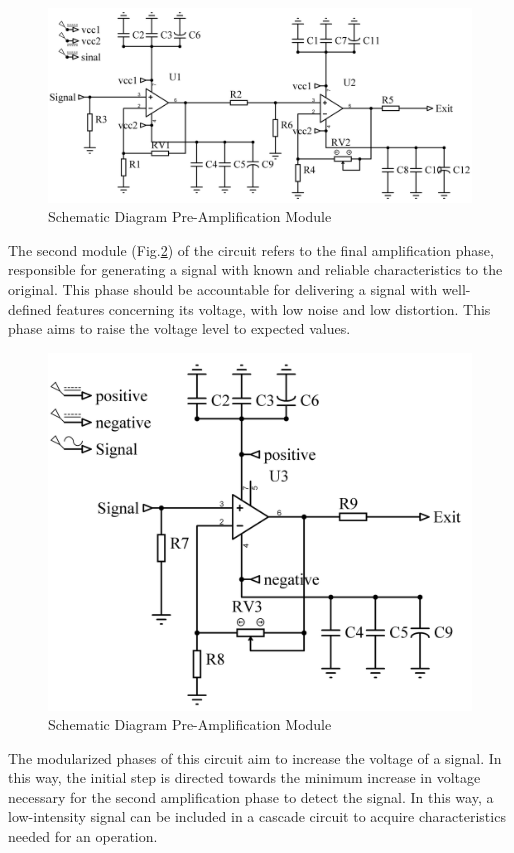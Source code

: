 \documentclass{ws-m3as}
\begin{document}
\begin{figure}[H]
	\centering  
	\includegraphics[width=0.9\linewidth]{Figures/SchematicPreamp}
	\caption{Schematic Diagram Pre-Amplification Module}
	\label{fig:7}
\end{figure}

The second module (Fig.\ref{fig:8}) of the circuit refers to the final amplification phase, responsible for generating a signal with known and reliable characteristics to the original. This phase should be accountable for delivering a signal with well-defined features concerning its voltage, with low noise and low distortion. This phase aims to raise the voltage level to expected values.

\begin{figure}[H]
	\centering  
	\includegraphics[width=0.6\linewidth]{Figures/SchematicAmp}
	\caption{Schematic Diagram Pre-Amplification Module}
	\label{fig:8}
\end{figure}

The modularized phases of this circuit aim to increase the voltage of a signal. In this way, the initial step is directed towards the minimum increase in voltage necessary for the second amplification phase to detect the signal. In this way, a low-intensity signal can be included in a cascade circuit to acquire characteristics needed for an operation.
\end{document}
